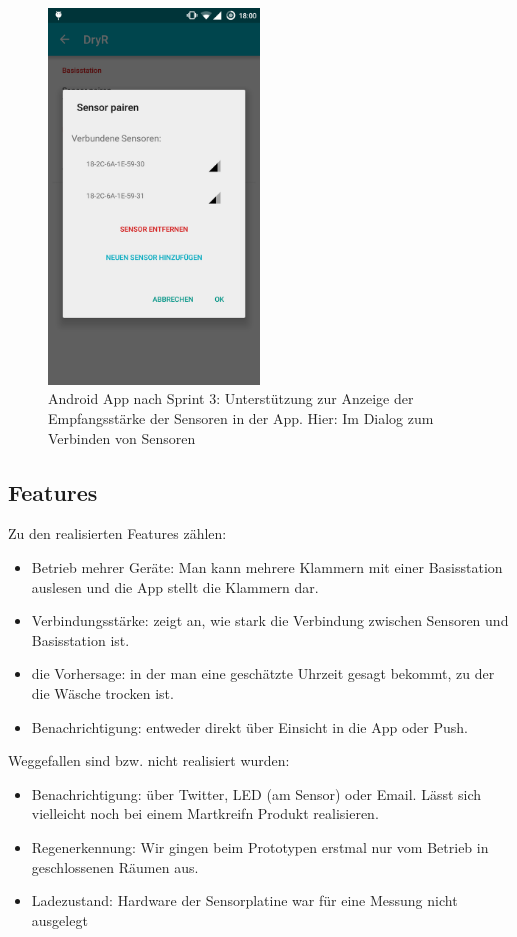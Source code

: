 \begin{figure}[htb] 
	\centerline{\includegraphics[width=0.5\textwidth]{pair_sensor_dialog_reception.png}}
	\caption{Android App nach Sprint 3: Unterstützung zur Anzeige der Empfangsstärke der Sensoren in der App. Hier: Im Dialog zum Verbinden von Sensoren}
	\label{screenshot_sprint_3_pair_sensor}
\end{figure}
\clearpage
	\subsection{Features}
		Zu den realisierten Features zählen:
		\begin{itemize}
\item Betrieb mehrer Geräte: Man kann mehrere Klammern mit einer Basisstation auslesen und die App stellt die Klammern dar.
\item Verbindungsstärke: zeigt an, wie stark die Verbindung zwischen Sensoren und Basisstation ist.
\item die Vorhersage: in der man eine geschätzte Uhrzeit gesagt bekommt, zu der die Wäsche trocken ist.
\item Benachrichtigung: entweder direkt über Einsicht in die App oder Push.
\end{itemize}
Weggefallen sind bzw. nicht realisiert wurden:
\begin{itemize}
\item Benachrichtigung: über Twitter, LED (am Sensor) oder Email. Lässt sich vielleicht noch bei einem Martkreifn Produkt realisieren. 
\item Regenerkennung: Wir gingen beim Prototypen erstmal nur vom Betrieb in geschlossenen Räumen aus. 
\item Ladezustand: Hardware der Sensorplatine war für eine Messung nicht ausgelegt
\end{itemize}